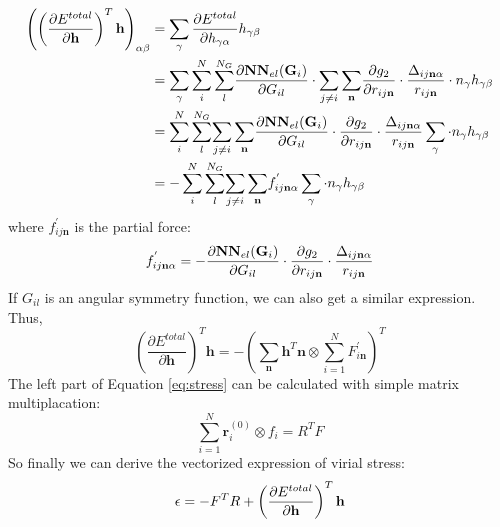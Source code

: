 \documentclass[final,1p,times]{elsarticle}
\begin{document}
\begin{align}
\label{eq:dEdhTh_g2_expanded}
\left(
    \left(\frac{\partial E^{total}}{\partial \mathbf{h}}\right)^T \mathbf{h}
\right)_{\alpha\beta} & = 
\sum_{\gamma}{\frac{\partial{E^{total}}}{\partial h_{\gamma\alpha}} h_{\gamma\beta}} \nonumber \\
& = \sum_{\gamma}{\sum_{i}^{N}{\sum_{l}^{N_G}}{
    \frac{\partial \mathbf{NN}_{el}(\mathbf{G}_i)}{\partial G_{il}}
    \cdot
    \sum_{j \neq i}{\sum_{\mathbf{n}}}{
    \frac{\partial g_2}{\partial r_{ij\mathbf{n}}} 
    \cdot 
    \frac{\Delta_{ij\mathbf{n}\alpha}}{r_{ij\mathbf{n}}} \cdot n_{\gamma}} h_{\gamma\beta}
}} \nonumber \\
& = \sum_{i}^{N}{\sum_{l}^{N_G}}{\sum_{j \neq i}{\sum_{\mathbf{n}}}{
    \frac{\partial \mathbf{NN}_{el}(\mathbf{G}_i)}{\partial G_{il}}
    \cdot
    \frac{\partial g_2}{\partial r_{ij\mathbf{n}}} 
    \cdot 
    \frac{\Delta_{ij\mathbf{n}\alpha}}{r_{ij\mathbf{n}}}}
    \sum_{\gamma}{\cdot n_{\gamma}h_{\gamma\beta}}
} \nonumber \\
& = -\sum_{i}^{N}{\sum_{l}^{N_G}}{\sum_{j \neq i}{\sum_{\mathbf{n}}}{
    f^{'}_{ij\mathbf{n}\alpha}
    \sum_{\gamma}{\cdot n_{\gamma}h_{\gamma\beta}}
}}
\end{align}
where $f^{'}_{ij\mathbf{n}}$ is the partial force:
\begin{equation}
f^{'}_{ij\mathbf{n}\alpha} = 
-\frac{\partial \mathbf{NN}_{el}(\mathbf{G}_i)}{\partial G_{il}} \cdot 
\frac{\partial g_2}{\partial r_{ij\mathbf{n}}} \cdot 
\frac{\Delta_{ij\mathbf{n}\alpha}}{r_{ij\mathbf{n}}}
\end{equation}
If $G_{il}$ is an angular symmetry function, we can also get a similar 
expression. Thus,
\begin{equation}
\left(\frac{\partial E^{total}}{\partial \mathbf{h}}\right)^T \mathbf{h} =
-\left(\sum_{\mathbf{n}}{\mathbf{h}^T\mathbf{n}} \otimes 
\sum_{i=1}^{N}{F^{\prime}_{i\mathbf{n}}}\right)^T
\end{equation}
The left part of Equation \ref{eq:stress} can be calculated with 
simple matrix multiplacation:
\begin{equation}
\sum_{i=1}^{N}{\mathbf{r}_i^{(0)} \otimes f_i} = R^{T} F
\end{equation}
So finally we can derive the vectorized expression of virial stress:
\begin{equation}
\epsilon = -F^{T} R + \left( \frac{\partial{E^{total}}}{\partial \mathbf{h}} \right)^T\mathbf{h}
\end{equation}
\end{document}
